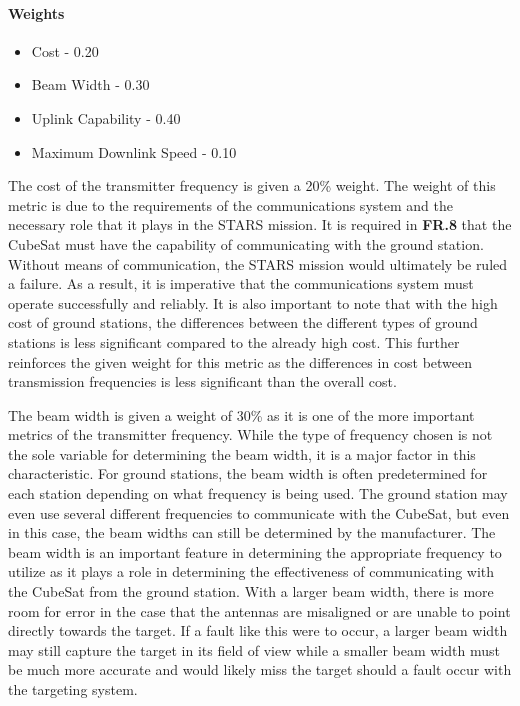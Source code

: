 \documentclass[3p]{elsarticle}
\begin{document}
\paragraph{Weights}
\begin{itemize}
    \item Cost - 0.20
    \item Beam Width - 0.30
    \item Uplink Capability - 0.40
    \item Maximum Downlink Speed - 0.10
\end{itemize}

The cost of the transmitter frequency is given a 20\% weight. The weight of this metric is due to the requirements of the communications system and the necessary role that it plays in the STARS mission. It is required in \textbf{FR.8} that the CubeSat must have the capability of communicating with the ground station. Without means of communication, the STARS mission would ultimately be ruled a failure. As a result, it is imperative that the communications system must operate successfully and reliably. It is also important to note that with the high cost of ground stations, the differences between the different types of ground stations is less significant compared to the already high cost. This further reinforces the given weight for this metric as the differences in cost between transmission frequencies is less significant than the overall cost. 

The beam width is given a weight of 30\% as it is one of the more important metrics of the transmitter frequency. While the type of frequency chosen is not the sole variable for determining the beam width, it is a major factor in this characteristic. For ground stations, the beam width is often predetermined for each station depending on what frequency is being used. The ground station may even use several different frequencies to communicate with the CubeSat, but even in this case, the beam widths can still be determined by the manufacturer. The beam width is an important feature in determining the appropriate frequency to utilize as it plays a role in determining the effectiveness of communicating with the CubeSat from the ground station. With a larger beam width, there is more room for error in the case that the antennas are misaligned or are unable to point directly towards the target. If a fault like this were to occur, a larger beam width may still capture the target in its field of view while a smaller beam width must be much more accurate and would likely miss the target should a fault occur with the targeting system. 
\end{document}
